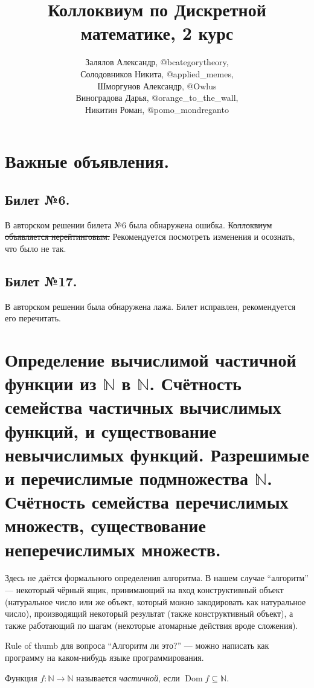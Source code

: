 \documentclass{article}
\title{Коллоквиум по Дискретной математике, 2 курс}
\author{Залялов Александр, @bcategorytheory,\\  Солодовников Никита, @applied\_memes, \\ Шморгунов Александр, @Owlus \\
Виноградова Дарья, @orange\_to\_the\_wall, \\ Никитин Роман, @pomo\_mondreganto}
\date{}
\begin{document}
    \maketitle

    \section*{Важные объявления.}
    \subsection*{Билет №6.} В авторском решении билета №6 была обнаружена ошибка. \sout{Коллоквиум
    объявляется нерейтинговым.} Рекомендуется посмотреть изменения и осознать, что было не так.

    \subsection*{Билет №17.} В авторском решении была обнаружена лажа. Билет исправлен, рекомендуется его перечитать.

    \tableofcontents

    \clearpage

    \section{Определение вычислимой частичной функции из \(\mathbb{N}\) в \(\mathbb{N}\).
    Счётность семейства частичных вычислимых функций, и существование невычислимых функций.
    Разрешимые и перечислимые подмножества \(\mathbb{N}\). Счётность семейства перечислимых множеств,
    существование неперечислимых множеств.}

    Здесь не даётся формального определения алгоритма. В нашем случае ``алгоритм'' --- некоторый
    чёрный ящик, принимающий на вход конструктивный объект (натуральное число или же объект, который
    можно закодировать как натуральное число), производящий некоторый результат (также конструктивный
    объект), а также работающий по шагам (некоторые атомарные действия вроде сложения).

    Rule of thumb для вопроса ``Алгоритм ли это?'' --- можно написать как программу на каком-нибудь
    языке программирования.

    \begin{definition}
        Функция \(f: \mathbb{N} \to \mathbb{N}\) называется \textit{частичной}, если \(\operatorname{Dom} f \subseteq \mathbb{N}\).
    \end{definition}
\end{document}
